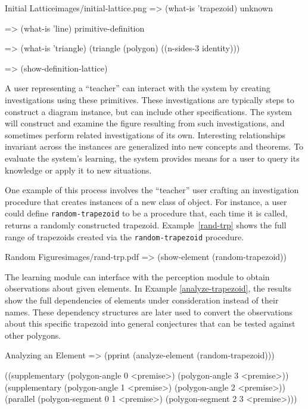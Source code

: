 \begin{img-example}
[label=initial-lattice,
breakable=false]
{Initial Lattice}{images/initial-lattice.png}
=> (what-is 'trapezoid)
unknown

=> (what-is 'line)
primitive-definition

=> (what-is 'triangle)
(triangle (polygon)
          ((n-sides-3 identity)))

=> (show-definition-lattice)
\end{img-example}

A user representing a ``teacher'' can interact with the system by
creating investigations using these primitives. These investigations
are typically steps to construct a diagram instance, but can include
other specifications. The system will construct and examine the figure
resulting from such investigations, and sometimes perform related
investigations of its own. Interesting relationships invariant across
the instances are generalized into new concepts and theorems. To
evaluate the system's learning, the system provides means for a user
to query its knowledge or apply it to new situations.

One example of this process involves the ``teacher'' user crafting an
investigation procedure that creates instances of a new class of
object. For instance, a user could define \texttt{random-trapezoid} to
be a procedure that, each time it is called, returns a randomly
constructed trapezoid. Example~\ref{rand-trp} shows the full range of
trapezoids created via the \texttt{random-trapezoid} procedure.

\begin{pdf-example}
[label=rand-trp,
comment style={frame hidden,opacityback=0,
raster columns=3,graphics pages={1,2,3}}]
{Random Figures}{images/rand-trp.pdf}
=> (show-element (random-trapezoid))
\end{pdf-example}

The learning module can interface with the perception module to obtain
observations about given elements. In Example \ref{analyze-trapezoid},
the results show the full dependencies of elements under consideration
instead of their names. These dependency structures are later used to
convert the observations about this specific trapezoid into general
conjectures that can be tested against other polygons.

\begin{repl-example}
[label=analyze-trapezoid]
{Analyzing an Element}
=> (pprint (analyze-element (random-trapezoid)))

((supplementary (polygon-angle 0 <premise>) (polygon-angle 3 <premise>))
 (supplementary (polygon-angle 1 <premise>) (polygon-angle 2 <premise>))
 (parallel (polygon-segment 0 1 <premise>) (polygon-segment 2 3 <premise>)))
\end{repl-example}

